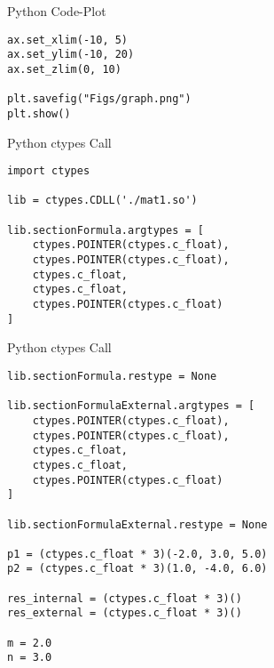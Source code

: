 \documentclass{beamer}
\begin{document}
\begin{frame}[fragile]{Python Code-Plot}
\begin{verbatim}
ax.set_xlim(-10, 5)
ax.set_ylim(-10, 20)
ax.set_zlim(0, 10)

plt.savefig("Figs/graph.png")
plt.show()
\end{verbatim}
\end{frame}


\begin{frame}[fragile]{Python ctypes Call}
\begin{verbatim}
import ctypes

lib = ctypes.CDLL('./mat1.so')

lib.sectionFormula.argtypes = [
    ctypes.POINTER(ctypes.c_float),
    ctypes.POINTER(ctypes.c_float),
    ctypes.c_float,
    ctypes.c_float,
    ctypes.POINTER(ctypes.c_float)
]
\end{verbatim}
\end{frame}

\begin{frame}[fragile]{Python ctypes Call}
\begin{verbatim}
lib.sectionFormula.restype = None

lib.sectionFormulaExternal.argtypes = [
    ctypes.POINTER(ctypes.c_float),
    ctypes.POINTER(ctypes.c_float),
    ctypes.c_float,
    ctypes.c_float,
    ctypes.POINTER(ctypes.c_float)
]

lib.sectionFormulaExternal.restype = None

p1 = (ctypes.c_float * 3)(-2.0, 3.0, 5.0)
p2 = (ctypes.c_float * 3)(1.0, -4.0, 6.0)

res_internal = (ctypes.c_float * 3)()
res_external = (ctypes.c_float * 3)()

m = 2.0
n = 3.0
\end{verbatim}
\end{frame}
\end{document}

